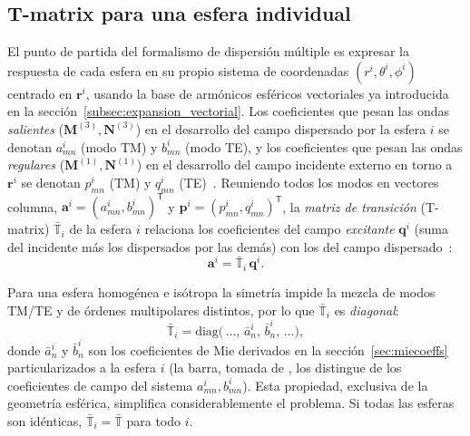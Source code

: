\subsection{T-matrix para una esfera individual}
 
El punto de partida del formalismo de dispersión múltiple es expresar la
respuesta de cada esfera en su propio sistema de coordenadas
$(r^i,\theta^i,\phi^i)$ centrado en $\mathbf{r}^i$, usando la base de
armónicos esféricos vectoriales ya introducida en la
sección~\ref{subsec:expansion_vectorial}. Los coeficientes que pesan las
ondas \textit{salientes} ($\mathbf{M}^{(3)},\mathbf{N}^{(3)}$) en el
desarrollo del campo dispersado por la esfera $i$ se denotan
$a_{mn}^{i}$ (modo TM) y $b_{mn}^{i}$ (modo TE), y los coeficientes que
pesan las ondas \textit{regulares} ($\mathbf{M}^{(1)},\mathbf{N}^{(1)}$)
en el desarrollo del campo incidente externo en torno a $\mathbf{r}^i$ se
denotan $p_{mn}^{i}$ (TM) y $q_{mn}^{i}$ (TE)~\cite[ecs.~7,~8,~17]{Mackowski1991}.
Reuniendo todos los modos en vectores columna,
$\mathbf{a}^{i} = (a_{mn}^{i}, b_{mn}^{i})^{\mathsf{T}}$ y
$\mathbf{p}^{i} = (p_{mn}^{i}, q_{mn}^{i})^{\mathsf{T}}$, la
\textit{matriz de transición} (T-matrix) $\bar{\mathbb{T}}_i$ de la esfera
$i$ relaciona los coeficientes del campo
\textit{excitante} $\mathbf{q}^{i}$ (suma del incidente más los
dispersados por las demás) con los del campo
dispersado~\cite{Mackowski1991,Mackowski1996}:
\begin{equation}
\label{eq:T_indiv}
  \mathbf{a}^{i} = \bar{\mathbb{T}}_i\,\mathbf{q}^{i}.
\end{equation}
 
Para una esfera homogénea e isótropa la simetría impide la mezcla de
modos TM/TE y de órdenes multipolares distintos, por lo que
$\bar{\mathbb{T}}_i$ es \textit{diagonal}:
\begin{equation}
  \bar{\mathbb{T}}_i
  = \mathrm{diag}\bigl(\,\ldots,\,\bar{a}_n^{i},\,\bar{b}_n^{i},\,\ldots\bigr),
\end{equation}
donde $\bar{a}_n^{i}$ y $\bar{b}_n^{i}$ son los coeficientes de Mie
derivados en la sección~\ref{sec:miecoeffs} particularizados a la esfera
$i$ (la barra, tomada de \cite{Mackowski1996}, los distingue de los
coeficientes de campo del sistema $a_{mn}^{i}, b_{mn}^{i}$). Esta
propiedad, exclusiva de la geometría esférica, simplifica
considerablemente el problema. Si todas las esferas son
idénticas, $\bar{\mathbb{T}}_i = \bar{\mathbb{T}}$ para todo
$i$.
 
